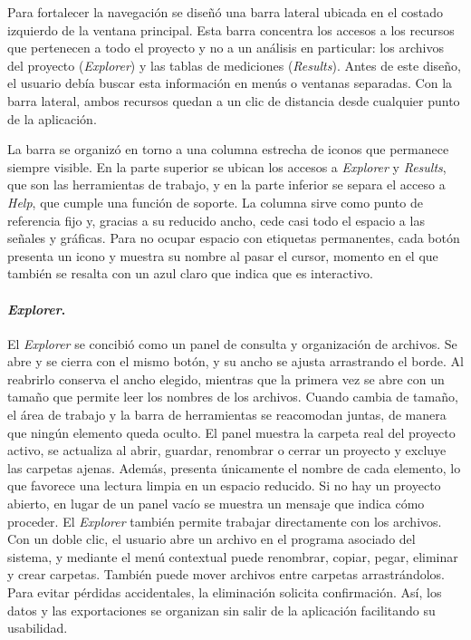 \documentclass[12pt,letterpaper,oneside]{article}
\begin{document}
Para fortalecer la navegación se diseñó una barra lateral ubicada en el costado izquierdo de la ventana principal. Esta barra concentra los accesos a los recursos que pertenecen a todo el proyecto y no a un análisis en particular: los archivos del proyecto (\textit{Explorer}) y las tablas de mediciones (\textit{Results}). Antes de este diseño, el usuario debía buscar esta información en menús o ventanas separadas. Con la barra lateral, ambos recursos quedan a un clic de distancia desde cualquier punto de la aplicación.

La barra se organizó en torno a una columna estrecha de iconos que permanece siempre visible. En la parte superior se ubican los accesos a \textit{Explorer} y \textit{Results}, que son las herramientas de trabajo, y en la parte inferior se separa el acceso a \textit{Help}, que cumple una función de soporte. La columna sirve como punto de referencia fijo y, gracias a su reducido ancho, cede casi todo el espacio a las señales y gráficas. Para no ocupar espacio con etiquetas permanentes, cada botón presenta un icono y muestra su nombre al pasar el cursor, momento en el que también se resalta con un azul claro que indica que es interactivo.

\paragraph{\textit{Explorer}.} El \textit{Explorer} se concibió como un panel de consulta y organización de archivos. Se abre y se cierra con el mismo botón, y su ancho se ajusta arrastrando el borde. Al reabrirlo conserva el ancho elegido, mientras que la primera vez se abre con un tamaño que permite leer los nombres de los archivos. Cuando cambia de tamaño, el área de trabajo y la barra de herramientas se reacomodan juntas, de manera que ningún elemento queda oculto. El panel muestra la carpeta real del proyecto activo, se actualiza al abrir, guardar, renombrar o cerrar un proyecto y excluye las carpetas ajenas. Además, presenta únicamente el nombre de cada elemento, lo que favorece una lectura limpia en un espacio reducido. Si no hay un proyecto abierto, en lugar de un panel vacío se muestra un mensaje que indica cómo proceder. El \textit{Explorer} también permite trabajar directamente con los archivos. Con un doble clic, el usuario abre un archivo en el programa asociado del sistema, y mediante el menú contextual puede renombrar, copiar, pegar, eliminar y crear carpetas. También puede mover archivos entre carpetas arrastrándolos. Para evitar pérdidas accidentales, la eliminación solicita confirmación. Así, los datos y las exportaciones se organizan sin salir de la aplicación facilitando su usabilidad.
\end{document}
